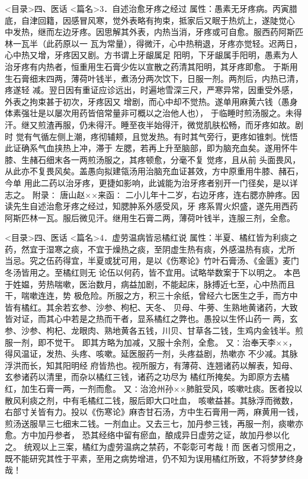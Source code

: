 \documentclass[a4paper,12pt,UTF8,twoside]{ctexbook}
\begin{document}
<目录>四、医话
<篇名>3．自述治愈牙疼之经过
属性：愚素无牙疼病。丙寅腊底，自津回籍，因感冒风寒，觉外表略有拘束，抵家后又眠于热炕上，遂陡觉心 
中发热，继而左边牙疼。因思解其外表，内热当消，牙疼或可自愈。服西药阿斯匹林一瓦半（此药原以一 
瓦为常量），得微汗，心中热稍退，牙疼亦觉轻。迟两日，心中热又增，牙疼因又剧。方书谓上牙龈属足 
阳明，下牙龈属手阳明，愚素为人治牙疼有内热者，恒重用生石膏少佐以宣散之药清其阳明，其牙疼即愈。 
于斯用生石膏细末四两，薄荷叶钱半，煮汤分两次饮下，日服一剂。两剂后，内热已清，疼遂轻 
减。翌日因有重证应诊远出，时遍地雪深三尺，严寒异常，因重受外感，外表之拘束甚于初次，牙疼因又 
增剧，而心中却不觉热。遂单用麻黄六钱（愚身体素强壮是以屡次用药皆倍常量非可概以之治他人也）， 
于临睡时煎汤服之。未得汗。继又煎渣再服，仍未得汗。睡至夜半始得汗，微觉肌肤松畅，而牙疼如故。剧时 
觉有气循左侧上潮，疼彻辅颊，且觉发热。有时其气旁行，更疼如锥刺。恍悟此证确系气血挟热上冲，滞于 
左腮，若再上升至脑部，即为脑充血矣。遂用怀牛膝、生赭石细末各一两煎汤服之，其疼顿愈，分毫不复 
觉疼，且从前 
头面畏风，从此亦不复畏风矣。盖愚向拟建瓴汤用治脑充血证甚效，方中原重用牛膝、赭石，今单 
用此二药以治牙疼，更捷如影响，此诚能为治牙疼者别开一门径矣，是以详志之。 
附录∶ 
唐山赵××来函∶ 
二小儿年十二岁，右边牙疼，连右腮亦肿疼。因读先生自述治愈牙疼之经过，知腮肿系外感受风，牙 
疼系胃火炽盛，遂先用西药阿斯匹林一瓦。服后微见汗。继用生石膏二两，薄荷叶钱半，连服三剂，全愈。 

<目录>四、医话
<篇名>4．虚劳温病皆忌橘红说
属性：半夏、橘红皆为利痰之药，然宜于湿寒之痰，不宜于燥热之痰，至阴虚生热有痰，外感温热有痰，尤所 
当忌。究之伍药得宜，半夏或犹可用，是以《伤寒论》竹叶石膏汤、《金匮》麦门冬汤皆用之。至橘红则无 
论伍以何药，皆不宜用。试略举数案于下以明之。 
本邑于姓媪，劳热喘嗽，医治数月，病益加剧，不能起床，脉搏近七至，心中热而且干，喘嗽连连，势 
极危险。所服之方，积三十余纸，曾经六七医生之手，而方中皆有橘红。其余若玄参、沙参、枸杞、天冬、 
贝母、牛蒡、生熟地黄诸药，大致皆对证，而其心中若是之热而干者，显系橘红之弊也。愚投以生怀山药一 
两，玄参、沙参、枸杞、龙眼肉、熟地黄各五钱，川贝、甘草各二钱，生鸡内金钱半。煎服一剂，即不觉干。 
即其方略为加减，又服十余剂，全愈。 
又∶治奉天李××，得风温证，发热、头疼、咳嗽。延医服药一剂，头疼益剧，热嗽亦 
不少减。其脉浮洪而长，知其阳明经 
府皆热也。视所服方，有薄荷、连翘诸药以解表，知母、玄参诸药以清里，而杂以橘红三钱，诸药之功尽为 
橘红所掩矣。为即原方去橘红，加生石膏一两，一剂而愈。 
又∶治沧州孙××肺脏受风，咳嗽吐痰。医者投以散风利痰之剂，中有毛橘红二钱，服后即大口吐血， 
咳嗽益甚。其脉浮而微数，右部寸关皆有力。投以《伤寒论》麻杏甘石汤，方中生石膏用一两，麻黄用一钱， 
煎汤送服旱三七细末二钱。一剂血止。又去三七，加丹参三钱，再服一剂，痰嗽亦愈。方中加丹参者， 
恐其经络中留有瘀血，酿成异日虚劳之证，故加丹参以化之。 
统观以上三案，橘红为虚劳温病之禁药，不彰彰可考哉！而 
医者习惯用之，既不能研究其性于平素，至用之病势增进，仍不知为误用橘红所致，不将梦梦终身哉！ 
\end{document}
